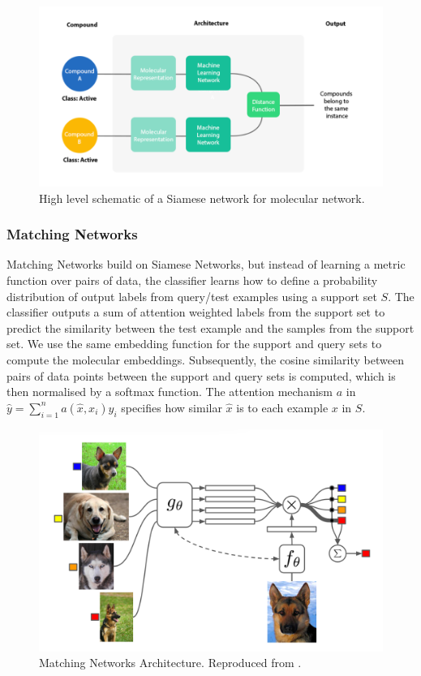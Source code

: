 \begin{figure}[h]
	\centering
	\includegraphics[width=0.9\linewidth]{img/high-level siamese.png}
	\caption[High-level schematic of Siamese network]{High level schematic of a Siamese network for molecular network. }
	\label{fig:siamesenetarchi}
\end{figure}

\subsubsection{Matching Networks}

Matching Networks \cite{vinyals2016matching} build on Siamese Networks, but instead of learning a metric function over pairs of data, the classifier learns how to define a probability distribution of output labels from query/test examples using a support set $S$. The classifier outputs a sum of attention weighted labels from the support set to predict the similarity between the test example and the samples from the support set. We use the same embedding function for the support and query sets to compute the molecular embeddings. Subsequently, the cosine similarity between pairs of data points between the support and query sets is computed, which is then normalised by a softmax function. The attention mechanism $a$ in $\hat{y} = \sum_{i=1}^{n} a(\hat{x}, x_i)y_i$ specifies how similar $\hat{x}$ is to each example $x$ in $S$.

\begin{figure}[!ht]
	\centering
	\includegraphics[width=0.7\linewidth]{img/matching_networks.png}
	\caption[Matching Networks Architecture]{Matching Networks Architecture. Reproduced from \citet{vinyals2016matching}.}
	\label{fig:matchingnets}
\end{figure}

